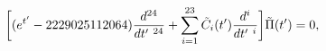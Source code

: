 \begin{equation}
\label{eq:PFdiffeq0}
\biggl[(e^{t^\prime} - 2229025112064){d^{24}\over dt^\prime\ ^{24}}
+\sum_{i=1}^{23}\tilde{C}_i(t^\prime){d^i\over dt^\prime\ ^i}
\biggr]\tilde{\Pi}(t^\prime)=0,
\end{equation}

